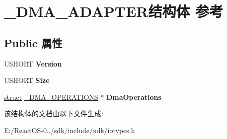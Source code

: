 \hypertarget{struct___d_m_a___a_d_a_p_t_e_r}{}\section{\+\_\+\+D\+M\+A\+\_\+\+A\+D\+A\+P\+T\+E\+R结构体 参考}
\label{struct___d_m_a___a_d_a_p_t_e_r}
\subsection*{Public 属性}
\begin{DoxyCompactItemize}
\item 
\mbox{\label{struct___d_m_a___a_d_a_p_t_e_r_afd3de7dfdcafd41879e59a0d80c91367}} 
U\+S\+H\+O\+RT {\bfseries Version}
\item 
\mbox{\label{struct___d_m_a___a_d_a_p_t_e_r_afbefc64164aac006ed1443055bc95f14}} 
U\+S\+H\+O\+RT {\bfseries Size}
\item 
\mbox{\label{struct___d_m_a___a_d_a_p_t_e_r_a3ef07d4d14f8e24821d3d99a81ba5edb}} 
\hyperlink{interfacestruct}{struct} \hyperlink{struct___d_m_a___o_p_e_r_a_t_i_o_n_s}{\+\_\+\+D\+M\+A\+\_\+\+O\+P\+E\+R\+A\+T\+I\+O\+NS} $\ast$ {\bfseries Dma\+Operations}
\end{DoxyCompactItemize}


该结构体的文档由以下文件生成\+:\begin{DoxyCompactItemize}
\item 
E\+:/\+React\+O\+S-\/0../sdk/include/xdk/iotypes.\+h\end{DoxyCompactItemize}
